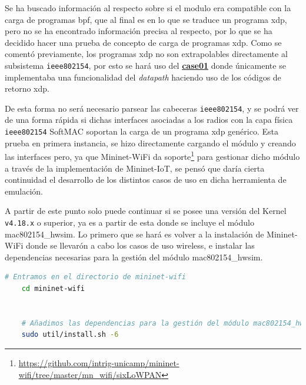 Se ha buscado información al respecto sobre si el modulo era compatible con la carga de programas \gls{bpf}, que al final es en lo que se traduce un programa \gls{xdp}, pero no se ha encontrado información precisa al respecto, por lo que se ha decidido hacer una prueba de concepto de carga de programas \gls{xdp}. Como se comentó previamente, los programas \gls{xdp} no son extrapolables directamente al subsistema \texttt{ieee802154}, por esto se hará uso del \href{https://github.com/davidcawork/TFG/tree/master/src/use_cases/xdp/case01}{\textbf{case01}} donde únicamente se implementaba una funcionalidad del \textit{datapath} haciendo uso de los códigos de retorno \gls{xdp}.\\
\par


De esta forma no será necesario parsear las cabeceras \texttt{ieee802154}, y se podrá ver de una forma rápida si dichas interfaces asociadas a los radios con la capa física \texttt{ieee802154} SoftMAC soportan la carga de un programa \gls{xdp} genérico. Esta prueba en primera instancia, se hizo directamente cargando el módulo y creando las interfaces pero, ya que Mininet-WiFi da soporte\footnote{\url{https://github.com/intrig-unicamp/mininet-wifi/tree/master/mn_wifi/sixLoWPAN}} para gestionar dicho módulo a través de la implementación de Mininet-IoT, se pensó que daría cierta continuidad el desarrollo de los distintos casos de uso en dicha herramienta de emulación. \\

\par

A partir de este punto solo puede continuar si se posee una versión del Kernel \texttt{v4.18.x} o superior, ya es a partir de esta donde se incluye el módulo mac802154\_hwsim. Lo primero que se hará es volver a la instalación de Mininet-WiFi donde se llevarón a cabo los casos de uso wireless, e instalar las dependencias necesarias para la gestión del módulo mac802154\_hwsim. 

\begin{lstlisting}[language= bash, style=Consola, caption={Instalación de las dependencias de Mininet-WiFi - mac802154\_hwsim},label=code:futureW_installdeps6]
    # Entramos en el directorio de mininet-wifi
    cd mininet-wifi
    
    
    # Añadimos las dependencias para la gestión del módulo mac802154_hwsim
    sudo util/install.sh -6

\end{lstlisting}
\vspace{0.5cm}


